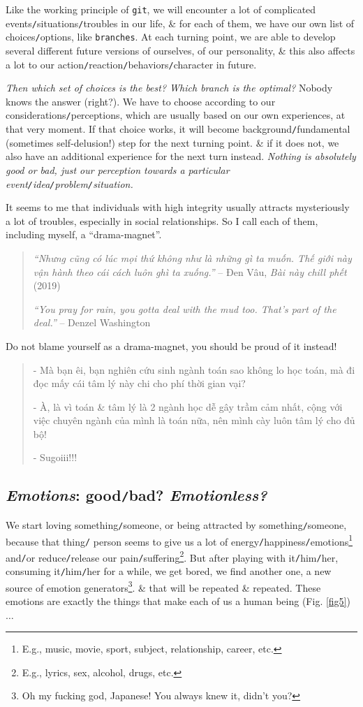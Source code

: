 \documentclass[12pt,twoside]{book}
\begin{document}
Like the working principle of {\tt git}, we will encounter a lot of complicated events{\tt/}situations{\tt/}troubles in our life, \& for each of them, we have our own list of choices{\tt/}options, like {\tt branches}. At each turning point, we are able to develop several different future versions of ourselves, of our personality, \& this also affects a lot to our action{\tt/}reaction{\tt/}behaviors{\tt/}character in future.

{\it Then which set of choices is the best? Which branch is the optimal?} Nobody knows the answer (right?). We have to choose according to our considerations{\tt/}perceptions, which are usually based on our own experiences, at that very moment. If that choice works, it will become background{\tt/}fundamental (sometimes self-delusion!) step for the next turning point. \& if it does not, we also have an additional experience for the next turn instead. {\it Nothing is absolutely good or bad, just our perception towards a particular event{\tt/}idea{\tt/}problem{\tt/}situation.}

It seems to me that individuals with high integrity usually attracts mysteriously a lot of troubles, especially in social relationships. So I call each of them, including myself, a ``drama-magnet''.

\begin{quotation}
	{\it``Nhưng cũng có lúc mọi thứ không như là những gì ta muốn. Thế giới này vận hành theo cái cách luôn ghì ta xuống.''} -- {\sc Đen Vâu}, {\it Bài này chill phết} (2019)
	
	{\it``You pray for rain, you gotta deal with the mud too. That's part of the deal.''} -- {\sc Denzel Washington}
\end{quotation}
Do not blame yourself as a drama-magnet, you should be proud of it instead!
\begin{quote}
	- Mà bạn êi, bạn nghiên cứu sinh ngành toán sao không lo học toán, mà đi đọc mấy cái tâm lý này chi cho phí thời gian vại?
	
	- À, là vì toán \& tâm lý là 2 ngành học dễ gây trầm cảm nhất, cộng với việc chuyên ngành của mình là toán nữa, nên mình cày luôn tâm lý cho đủ bộ!
	
	- Sugoiii!!!
\end{quote}

\subsection{{\it Emotions}: good{\tt/}bad? {\it Emotionless?}}
 We start loving something{\tt/}someone, or being attracted by something{\tt/}someone, because that thing{\tt/} person seems to give us a lot of energy{\tt/}happiness{\tt/}emotions\footnote{E.g., music, movie, sport, subject, relationship, career, etc.} and{\tt/}or reduce{\tt/}release our pain{\tt/}suffering\footnote{E.g., lyrics, sex, alcohol, drugs, etc.}. But after playing with it{\tt/}him{\tt/}her, consuming it{\tt/}him{\tt/}her for a while, we get bored, we find another one, a new source of emotion generators\footnote{Oh my fucking god, Japanese! You always knew it, didn't you?}. \& that will be repeated \& repeated. These emotions are exactly the things that make each of us a human being (Fig. \ref{fig5})$\ldots$
\end{document}
